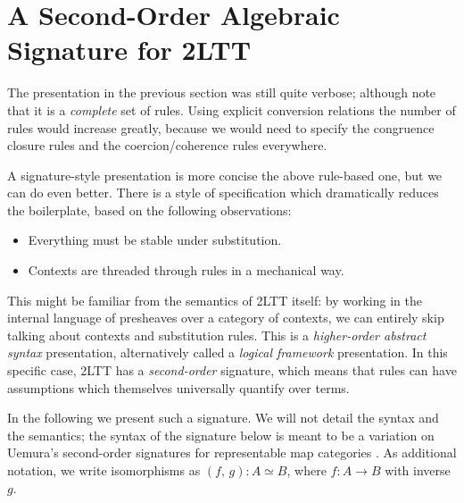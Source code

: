 \documentclass[acmsmall,screen]{acmart}
\theoremstyle{remark}
\begin{document}
\section{A Second-Order Algebraic Signature for 2LTT}

The presentation in the previous section was still quite verbose; although note
that it is a \emph{complete} set of rules. Using explicit conversion relations
the number of rules would increase greatly, because we would need to specify the
congruence closure rules and the coercion/coherence rules everywhere.

A signature-style presentation is more concise the above rule-based one, but we
can do even better. There is a style of specification which dramatically reduces
the boilerplate, based on the following observations:
\begin{itemize}
  \item Everything must be stable under substitution.
  \item Contexts are threaded through rules in a mechanical way.
\end{itemize}
This might be familiar from the semantics of 2LTT itself: by working in the
internal language of presheaves over a category of contexts, we can entirely
skip talking about contexts and substitution rules. This is a \emph{higher-order
abstract syntax} presentation, alternatively called a \emph{logical framework}
\cite{DBLP:journals/jacm/HarperHP93} presentation. In this specific case, 2LTT
has a \emph{second-order} signature, which means that rules can have assumptions
which themselves universally quantify over terms.

In the following we present such a signature. We will not detail the syntax and
the semantics; the syntax of the signature below is meant to be a variation on
Uemura's second-order signatures for representable map categories
\cite{uemura}. As additional notation, we write isomorphisms as $(f,\,g) : A
\simeq B$, where $f : A \to B$ with inverse $g$.
\end{document}
